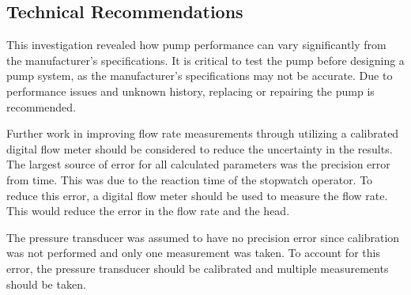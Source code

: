 \subsection{Technical Recommendations}
This investigation revealed how pump performance can vary significantly from the manufacturer's specifications. It is critical to test the pump before designing a pump system, as the manufacturer's specifications may not be accurate. Due to performance issues and unknown history, replacing or repairing the pump is recommended. 

Further work in improving flow rate measurements through utilizing a calibrated digital flow meter should be considered to reduce the uncertainty in the results.
The largest source of error for all calculated parameters was the precision error from time. This was due to the reaction time of the stopwatch operator. To reduce this error, a digital flow meter should be used to measure the flow rate. This would reduce the error in the flow rate and the head.

The pressure transducer was assumed to have no precision error since calibration was not performed and only one measurement was taken. To account for this error, the pressure transducer should be calibrated and multiple measurements should be taken.
